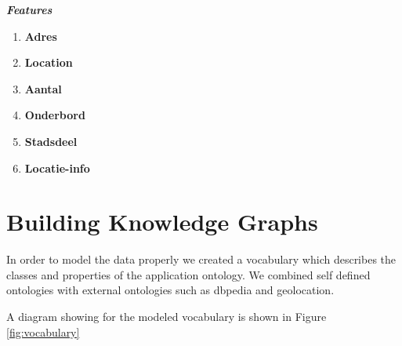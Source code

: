 \documentclass[runningheads,a4paper]{../../StyleFiles/llncs}
\begin{document}
\begin{center}
	\textbf{\emph{Features}}
	\setlength{\columnsep}{4em}
	\begin{multicols}{2}
		\begin{enumerate}
			\item \textbf{Adres}
			\item \textbf{Location}
			\item \textbf{Aantal}
			\item \textbf{Onderbord}
			\item \textbf{Stadsdeel}	
			\item \textbf{Locatie-info}				
		\end{enumerate}
	\end{multicols}
\end{center} 

\section{Building Knowledge Graphs}
In order to model the data properly we created a vocabulary which describes the classes and properties of the application ontology. We combined self defined ontologies with external ontologies such as dbpedia and geolocation. %

A diagram showing for the modeled vocabulary is shown in Figure \ref{fig:vocabulary}
\end{document}
